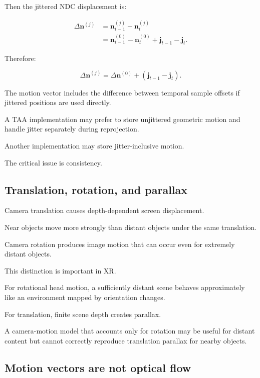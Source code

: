 Then the jittered NDC displacement is:

\[
 \begin{aligned} \Delta\mathbf n^{(j)} &= \mathbf n_{t-1}^{(j)}-\mathbf n_t^{(j)}\\ &= \mathbf n_{t-1}^{(0)}-\mathbf n_t^{(0)} +\mathbf j_{t-1}-\mathbf j_t. \end{aligned}
\]

Therefore:

\[
 \boxed{ \Delta\mathbf n^{(j)} = \Delta\mathbf n^{(0)} + (\mathbf j_{t-1}-\mathbf j_t) }.
\]

The motion vector includes the difference between temporal sample offsets if jittered positions are used directly.

A TAA implementation may prefer to store unjittered geometric motion and handle jitter separately during reprojection.

Another implementation may store jitter-inclusive motion.

The critical issue is consistency.

\subsection{Translation, rotation, and parallax}\label{02-foundations-ii-ch036-translation-rotation-and-parallax}

\hypertarget{02-foundations-ii-ch036-translation-rotation-and-parallax}{}

Camera translation causes depth-dependent screen displacement.

Near objects move more strongly than distant objects under the same translation.

Camera rotation produces image motion that can occur even for extremely distant objects.

This distinction is important in XR.

For rotational head motion, a sufficiently distant scene behaves approximately like an environment mapped by orientation changes.

For translation, finite scene depth creates parallax.

A camera-motion model that accounts only for rotation may be useful for distant content but cannot correctly reproduce translation parallax for nearby objects.

\subsection{Motion vectors are not optical flow}\label{02-foundations-ii-ch036-motion-vectors-are-not-optical-flow}

